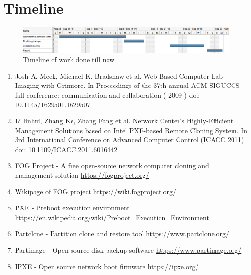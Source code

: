 \documentclass[a4paper,12pt]{article}
\begin{document}


\newpage
\section{\fontsize{16pt}{1em} Timeline}
 \begin{figure}[h!]
    \centering
    \includegraphics[width=\linewidth]{ganntt.png}
    \caption{Timeline of work done till now}
    \label{fig:Use case}
\end{figure}


\newpage


\begin{enumerate}
    \item Josh A. Meek, Michael K. Bradshaw et al. Web Based Computer Lab Imaging with Grimiore. In Proceedings of the 37th annual ACM SIGUCCS fall conference: communication and collaboration ( 2009 ) doi: 10.1145/1629501.1629507
    \item Li linhui, Zhang Ke, Zhang Fang et al. Network Center's Highly-Efficient Management Solutions based on Intel PXE-based Remote Cloning System.
    In 3rd International Conference on Advanced Computer Control (ICACC 2011)
    \newline
    doi: 10.1109/ICACC.2011.6016442
    \item \href{https://fogproject.org/}{FOG Project} - A free open-source network computer cloning and management solution
    \newline
    \url{https://fogproject.org/}
    
    \item Wikipage of FOG project
    \newline
    \url{https://wiki.fogproject.org/}
    \item PXE - Preboot execution environment
    \newline
    \url{https://en.wikipedia.org/wiki/Preboot_Execution_Environment}
    \item Partclone - Partition clone and restore tool
    \newline
    \url{https://www.partclone.org/}
    \item Partimage - Open source disk backup software
    \newline
    \url{https://www.partimage.org/}
    \item IPXE - Open source network boot firmware
    \newline
    \url{https://ipxe.org/}

\end{enumerate}
\end{document}
